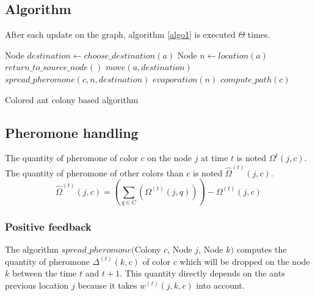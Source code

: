 \documentclass[a4paper,10pt]{article}
\begin{document}
\subsection{Algorithm}

After each update on the graph, algorithm \ref{algo1} is executed $\Theta$ times.\\

\begin{algorithm}[h]
\begin{algorithmic} 

\STATE Node $destination \leftarrow choose\_destination(a)$
\STATE Node $n \leftarrow location(a)$
\STATE $return\_to\_source\_node()$
\ELSE
\STATE $move(a, destination)$
\STATE $spread\_pheromone(c, n, destination)$
\ENDIF
\ENDFOR
{}
\STATE $evaporation(n)$
\ENDFOR
{}
\STATE $compute\_path(c)$
\ENDFOR
\end{algorithmic}
\caption{Colored ant colony based algorithm}
\label{algo1}
\end{algorithm}




\subsection{Pheromone handling}
The quantity of pheromone of color $c$ on the node $j$ at time $t$ is noted $\Omega^{t}(j,c)$. The quantity of pheromone of other colors than $c$ is noted $\hat \Omega^{(t)}(j,c)$.
\begin{equation*}
    \hat \Omega^{(t)}(j,c) = \left( \sum_{q \in C}(\Omega^{(t)} (j,q)) \right) - \Omega^{(t)} (j,c)
\end{equation*}



\subsubsection{Positive feedback}
The algorithm $spread\_pheromone($Colony $c$, Node $j$, Node $k)$ computes the quantity of pheromone $\Delta^{(t)}(k,c)$ of color $c$  which will be dropped on the node $k$ between the time $t$ and $t+1$. This quantity directly depends on the ants previous location $j$ because it takes $w^{(t)}(j,k,c)$ into account.
\end{document}
